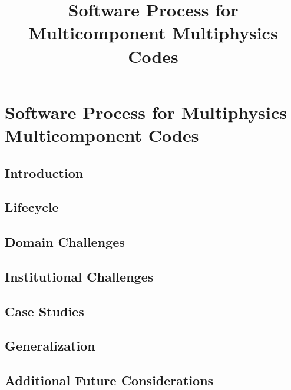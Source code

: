 \documentclass[sunil1]{sunil} %
\begin{document}
\title{Software Process for Multicomponent Multiphysics
  Codes}

\tableofcontents
%
%
%
%

\mainmatter





\chapter{Software Process for Multiphysics Multicomponent Codes}
\section {Introduction} 

\section{Lifecycle}

\section{Domain Challenges} 

\section{Institutional Challenges}

\section{Case Studies}
\label{sec:case-studies}


\section{Generalization} 

\section{Additional Future Considerations} 

\end{document}
